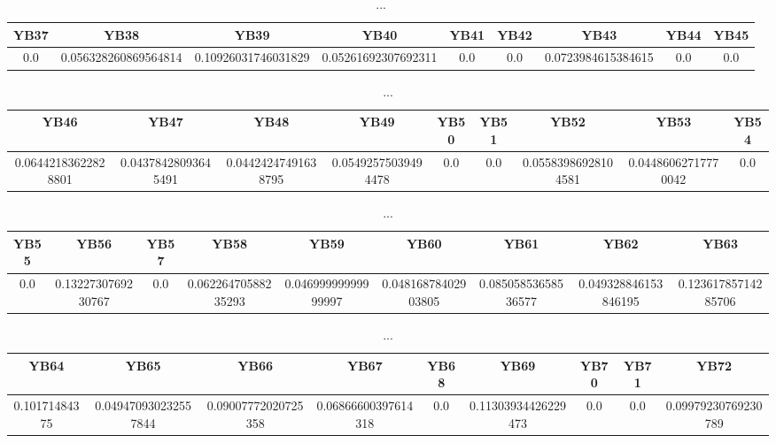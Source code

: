 \documentclass[]{article}
\begin{document}
\begin{table}[h]
      \centering
      \begin{tabular}{|c|c|c|c|c|c|c|c|c|}
            \hline
            YB37 & YB38                 & YB39                & YB40                & YB41 & YB42 & YB43               & YB44 & YB45 \\
            \hline
            0.0  & 0.056328260869564814 & 0.10926031746031829 & 0.05261692307692311 & 0.0  & 0.0  & 0.0723984615384615 & 0.0  & 0.0  \\
            \hline
      \end{tabular}
      \caption{...}
\end{table}
\begin{table}[h]
      \centering
      \begin{tabular}{|c|c|c|c|c|c|c|c|c|}
            \hline
            YB46                & YB47                & YB48                & YB49                & YB50 & YB51 & YB52                & YB53                & YB54 \\
            \hline
            0.06442183622828801 & 0.04378428093645491 & 0.04424247491638795 & 0.05492575039494478 & 0.0  & 0.0  & 0.05583986928104581 & 0.04486062717770042 & 0.0  \\
            \hline
      \end{tabular}
      \caption{...}
\end{table}
\begin{table}[h]
      \centering
      \begin{tabular}{|c|c|c|c|c|c|c|c|c|}
            \hline
            YB55 & YB56               & YB57 & YB58                & YB59                & YB60                & YB61                & YB62                 & YB63                \\
            \hline
            0.0  & 0.1322730769230767 & 0.0  & 0.06226470588235293 & 0.04699999999999997 & 0.04816878402903805 & 0.08505853658536577 & 0.049328846153846195 & 0.12361785714285706 \\
            \hline
      \end{tabular}
      \caption{...}
\end{table}
\begin{table}[h]
      \centering
      \begin{tabular}{|c|c|c|c|c|c|c|c|c|}
            \hline
            YB64          & YB65                 & YB66                & YB67                & YB68 & YB69                & YB70 & YB71 & YB72                \\
            \hline
            0.10171484375 & 0.049470930232557844 & 0.09007772020725358 & 0.06866600397614318 & 0.0  & 0.11303934426229473 & 0.0  & 0.0  & 0.09979230769230789 \\
            \hline
      \end{tabular}
      \caption{...}
\end{table}
\end{document}
